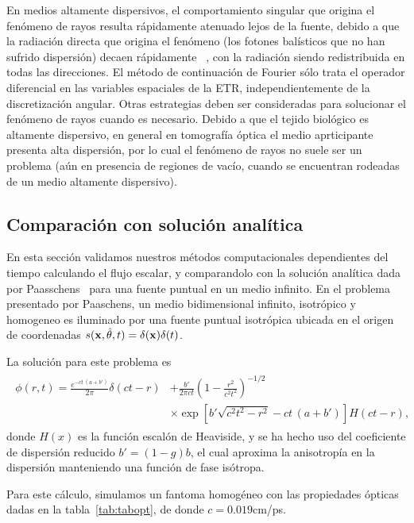 En medios altamente dispersivos, el comportamiento singular 
que origina el fenómeno de rayos resulta rápidamente atenuado lejos 
de la fuente, debido a que la radiación directa que origina el fenómeno 
(los fotones balísticos que no han sufrido dispersión) decaen rápidamente
~\cite{Ramankutty1997}, con la radiación siendo redistribuida en todas las 
direcciones. El método de continuación de Fourier sólo trata 
el operador diferencial en las variables espaciales de la ETR, independientemente 
de la discretización angular. Otras estrategias deben ser consideradas 
para solucionar el fenómeno de rayos cuando es necesario. Debido 
a que el tejido biológico es altamente dispersivo, en general 
en tomografía óptica el medio aprticipante presenta alta dispersión, 
por lo cual el fenómeno de rayos no suele ser un problema (aún 
en presencia de regiones de vacío, cuando se encuentran rodeadas de un 
medio altamente dispersivo).

\subsection{Comparación con solución analítica}

En esta sección validamos nuestros métodos computacionales 
dependientes del tiempo calculando el flujo escalar, 
y comparandolo con la solución analítica dada por Paasschens~\cite{Paasschens1997} 
para una fuente puntual en un medio infinito. 
En el problema presentado por Paaschens, un medio bidimensional infinito, 
isotrópico y homogeneo es iluminado por una fuente puntual isotrópica
ubicada en el origen de coordenadas $s(\mathbf{x},\hat{\theta},t)=\delta(\mathbf{x})\delta(t)$.

La solución para este problema es
\begin{equation}
\begin{split}
\begin{aligned}
\phi(r,t)=\frac{e^{-c t \, (a+b')}}{2\pi}\delta(ct-r)&+\frac{b'}{2\pi c t}\left(1-\frac{r^2}{c^2t^2}\right)^{-1/2}\\
&\times\exp\left[b'\sqrt{c^2t^2-r^2}-c t \, (a+b')\right]H(ct-r),
\end{aligned}
\end{split}
\label{eq:Paasschenssc}
\end{equation}
donde $H(x)$ es la función escalón de Heaviside, 
y se ha hecho uso del coeficiente de dispersión reducido $b'=(1-g)b$, 
el cual aproxima la anisotropía en la dispersión manteniendo una 
función de fase isótropa.

Para este cálculo, simulamos un fantoma homogéneo con las propiedades ópticas 
dadas en la tabla~\ref{tab:tabopt}, de donde $c=0.019$cm/ps.

